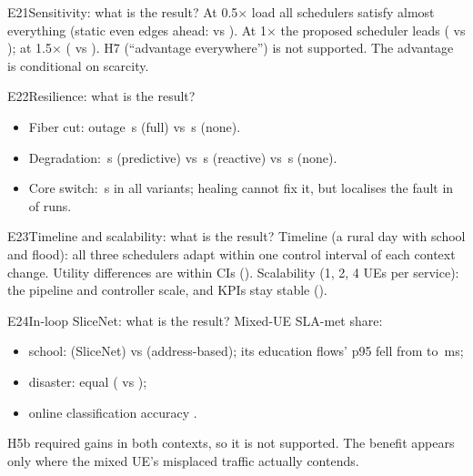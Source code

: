\begin{qa}{E21}{Sensitivity: what is the result?}
At 0.5$\times$ load all schedulers satisfy almost everything (static even edges ahead:
\NSensLoadSchoolStaticZeropFive{} vs \NSensLoadSchoolProposedZeropFive). At 1$\times$ the proposed scheduler leads
(\NSensLoadSchoolProposedOne{} vs \NSensLoadSchoolStaticOne); at 1.5$\times$ (\NSensLoadSchoolProposedOnepFive{} vs
\NSensLoadSchoolStaticOnepFive). H7 (``advantage everywhere'') is not supported. The advantage is conditional on
scarcity.
\end{qa}

\begin{qa}{E22}{Resilience: what is the result?}
\begin{itemize}
\item Fiber cut: outage \NOutCutFullMean\,s (full) vs \NOutCutNoneMean\,s (none).
\item Degradation: \NOutDegFullMean\,s (predictive) vs \NOutDegReactiveMean\,s (reactive) vs \NOutDegNoneMean\,s (none).
\item Core switch: \NOutCoreFullMean\,s in all variants; healing cannot fix it, but localises the fault in
\NCoreDiagnosedShare{} of runs.
\end{itemize}
\end{qa}

\begin{qa}{E23}{Timeline and scalability: what is the result?}
Timeline (a rural day with school and flood): all three schedulers adapt within one control interval of each context
change. Utility differences are within CIs (). Scalability (1, 2, 4 UEs per service): the
pipeline and controller scale, and KPIs stay stable ().
\end{qa}

\begin{qa}{E24}{In-loop SliceNet: what is the result?}
Mixed-UE SLA-met share:
\begin{itemize}
\item school: \NMixedSchoolSlicenetSla{} (SliceNet) vs \NMixedSchoolHostSla{} (address-based); its education flows'
p95 fell from \NMixedSchoolHostEduPninefive{} to \NMixedSchoolSlicenetEduPninefive\,ms;
\item disaster: equal (\NMixedDisasterSlicenetSla{} vs \NMixedDisasterHostSla);
\item online classification accuracy \NMixedSchoolOnlineAcc.
\end{itemize}
H5b required gains in both contexts, so it is not supported. The benefit appears only where the mixed UE's misplaced
traffic actually contends.
\end{qa}

